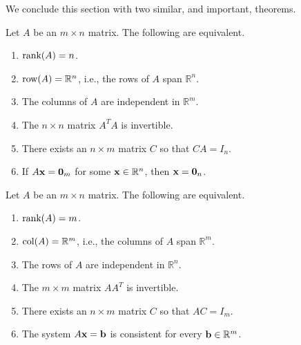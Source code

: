 We conclude this section with two similar, and important, theorems.

\begin{theorem}{}{}
Let $A$ be an $m\times n$ matrix.
The following are equivalent.
\begin{enumerate}
\item $\mbox{rank}(A)=n$.
\item $\mbox{row}(A)=\mathbb{R}^n$, i.e., the rows of $A$ span $\mathbb{R}^n$.
\item The columns of $A$ are independent in $\mathbb{R}^m$.
\item The $n\times n$ matrix $A^TA$ is invertible.
\item There exists an $n\times m$ matrix $C$ so that $CA=I_n$.
\item If $A{\bf x}={\bf 0}_m$ for some ${\bf x}\in\mathbb{R}^n$,
then ${\bf x}={\bf 0}_n$.
\end{enumerate}
\end{theorem}

\begin{theorem}{}{}
Let $A$ be an $m\times n$ matrix.
The following are equivalent.
\begin{enumerate}
\item $\mbox{rank}(A)=m$.
\item $\mbox{col}(A)=\mathbb{R}^m$, i.e., the columns of $A$ span $\mathbb{R}^m$.
\item The rows of $A$ are independent in $\mathbb{R}^n$.
\item The $m\times m$ matrix $AA^T$ is invertible.
\item There exists an $n\times m$ matrix $C$ so that $AC=I_m$.
\item The system $A{\bf x}={\bf b}$ is consistent for
every ${\bf b}\in\mathbb{R}^m$.
\end{enumerate}
\end{theorem}
